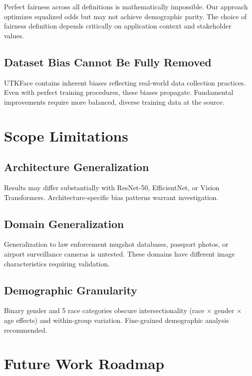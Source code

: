 \documentclass[11pt,a4paper,oneside]{report}
\begin{document}
Perfect fairness across all definitions is mathematically impossible. Our approach optimizes equalized odds but may not achieve demographic parity. The choice of fairness definition depends critically on application context and stakeholder values.

\subsection{Dataset Bias Cannot Be Fully Removed}

UTKFace contains inherent biases reflecting real-world data collection practices. Even with perfect training procedures, these biases propagate. Fundamental improvements require more balanced, diverse training data at the source.

\section{Scope Limitations}

\subsection{Architecture Generalization}

Results may differ substantially with ResNet-50, EfficientNet, or Vision Transformers. Architecture-specific bias patterns warrant investigation.

\subsection{Domain Generalization}

Generalization to law enforcement mugshot databases, passport photos, or airport surveillance cameras is untested. These domains have different image characteristics requiring validation.

\subsection{Demographic Granularity}

Binary gender and 5 race categories obscure intersectionality (race $\times$ gender $\times$ age effects) and within-group variation. Fine-grained demographic analysis recommended.

\section{Future Work Roadmap}
\end{document}
